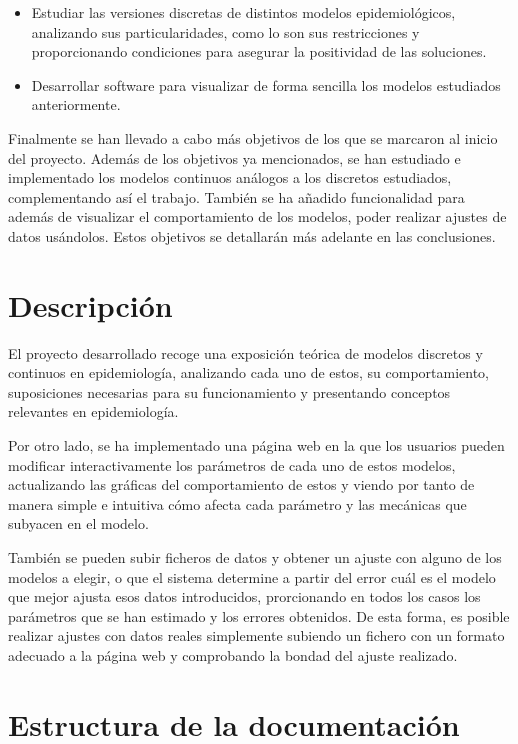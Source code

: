 \begin{itemize}
\item Estudiar las versiones discretas de distintos modelos epidemiológicos, analizando sus particularidades, como lo son sus restricciones y proporcionando condiciones para asegurar la positividad de las soluciones.
\item Desarrollar software para visualizar de forma sencilla los modelos estudiados anteriormente.
\end{itemize}

Finalmente se han llevado a cabo más objetivos de los que se marcaron al inicio del proyecto. Además de los objetivos ya mencionados, se han estudiado e implementado los modelos continuos análogos a los discretos estudiados, complementando así el trabajo. También se ha añadido funcionalidad para además de visualizar el comportamiento de los modelos, poder realizar ajustes de datos usándolos. Estos objetivos se detallarán más adelante en las conclusiones.


\section{Descripción}

El proyecto desarrollado recoge una exposición teórica de modelos discretos y continuos en epidemiología, analizando cada uno de estos, su comportamiento, suposiciones necesarias para su funcionamiento y presentando conceptos relevantes en epidemiología.

Por otro lado, se ha implementado una página web en la que los usuarios pueden modificar interactivamente los parámetros de cada uno de estos modelos, actualizando las gráficas del comportamiento de estos y viendo por tanto de manera simple e intuitiva cómo afecta cada parámetro y las mecánicas que subyacen en el modelo.

También se pueden subir ficheros de datos y obtener un ajuste con alguno de los modelos a elegir, o que el sistema determine a partir del error cuál es el modelo que mejor ajusta esos datos introducidos, prorcionando en todos los casos los parámetros que se han estimado y los errores obtenidos. De esta forma, es posible realizar ajustes con datos reales simplemente subiendo un fichero con un formato adecuado a la página web y comprobando la bondad del ajuste realizado.


\section{Estructura de la documentación}

